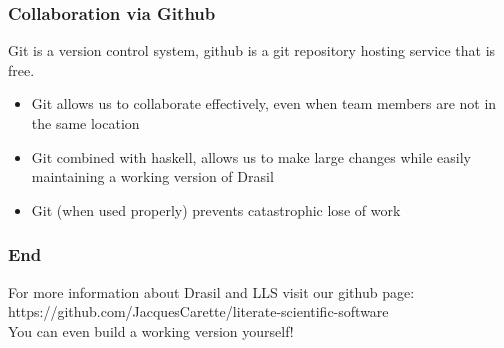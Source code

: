 \documentclass{beamer}
\begin{document}
\begin{frame}
\frametitle{Collaboration via Github}
Git is a version control system, github is a git repository hosting service that is \alert{free}.
\begin{itemize}
 \item<1-> Git allows us to collaborate effectively, even when team members are not in the same location
 \item<2-> Git combined with haskell, allows us to make large changes while easily maintaining a working version of Drasil
 \item<3-> Git \alert{(when used properly)} prevents catastrophic lose of work
\end{itemize}
\end{frame}

\begin{frame}
\frametitle{End}
For more information about Drasil and LLS visit our github page: \\
https://github.com/JacquesCarette/literate-scientific-software \\
\alert{You can even build a working version yourself!}
\end{frame}
\end{document}
